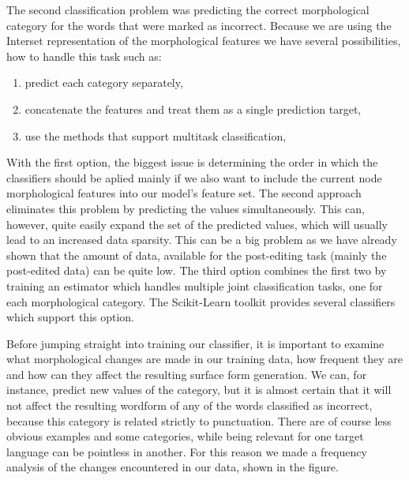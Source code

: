 
The second classification problem was predicting the correct morphological category for
the words that were marked as incorrect. Because we are using the Interset representation
of the morphological features we have several possibilities, how to handle this task such
as:
\begin{enumerate}
    \item predict each category separately,
    \item concatenate the features and treat them as a single prediction target,
    \item use the methods that support multitask classification,
\end{enumerate}

With the first option, the biggest issue is determining the order in which the classifiers
should be aplied mainly if we also want to include the current node morphological features
into our model's feature set. The second approach eliminates this problem by predicting the
values simultaneously. This can, however, quite easily expand the set of the predicted values,
which will usually lead to an increased data sparsity. This can be a big problem as we have
already shown that the amount of data, available for the post-editing task (mainly the post-edited
data) can be quite low. The third option combines the first two by training an estimator
which handles multiple joint classification tasks, one for each morphological category. The
Scikit-Learn toolkit provides several classifiers which support this option.

Before jumping straight into training our classifier, it is important to examine what morphological
changes are made in our training data, how frequent they are and how can they affect the resulting
surface form generation. We can, for instance, predict new values of the  category,
but it is almost certain that it will not affect the resulting wordform of any of the words
classified as incorrect, because this category is related strictly to punctuation. There are
of course less obvious examples and some categories, while being relevant for one target language
can be pointless in another. For this reason we made a frequency analysis of the changes encountered
in our data, shown in the figure. 
